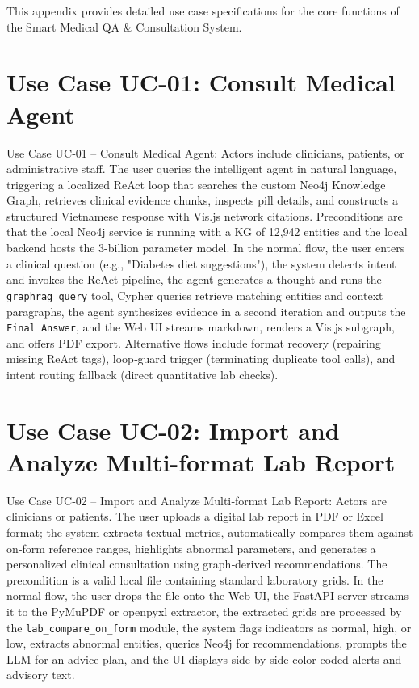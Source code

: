 \documentclass[../main.tex]{subfiles}
\begin{document}
This appendix provides detailed use case specifications for the core functions of the Smart Medical QA \& Consultation System.

\section{Use Case UC-01: Consult Medical Agent}
\label{section:uc-01}
Use Case UC‑01 – Consult Medical Agent: Actors include clinicians, patients, or administrative staff. The user queries the intelligent agent in natural language, triggering a localized ReAct loop that searches the custom Neo4j Knowledge Graph, retrieves clinical evidence chunks, inspects pill details, and constructs a structured Vietnamese response with Vis.js network citations. Preconditions are that the local Neo4j service is running with a KG of 12,942 entities and the local backend hosts the 3-billion parameter model. In the normal flow, the user enters a clinical question (e.g., "Diabetes diet suggestions"), the system detects intent and invokes the ReAct pipeline, the agent generates a thought and runs the \texttt{graphrag\_query} tool, Cypher queries retrieve matching entities and context paragraphs, the agent synthesizes evidence in a second iteration and outputs the \texttt{Final Answer}, and the Web UI streams markdown, renders a Vis.js subgraph, and offers PDF export. Alternative flows include format recovery (repairing missing ReAct tags), loop‑guard trigger (terminating duplicate tool calls), and intent routing fallback (direct quantitative lab checks).

\section{Use Case UC-02: Import and Analyze Multi-format Lab Report}
\label{section:uc-02}
Use Case UC‑02 – Import and Analyze Multi‑format Lab Report: Actors are clinicians or patients. The user uploads a digital lab report in PDF or Excel format; the system extracts textual metrics, automatically compares them against on‑form reference ranges, highlights abnormal parameters, and generates a personalized clinical consultation using graph‑derived recommendations. The precondition is a valid local file containing standard laboratory grids. In the normal flow, the user drops the file onto the Web UI, the FastAPI server streams it to the PyMuPDF or openpyxl extractor, the extracted grids are processed by the \texttt{lab\_compare\_on\_form} module, the system flags indicators as normal, high, or low, extracts abnormal entities, queries Neo4j for recommendations, prompts the LLM for an advice plan, and the UI displays side‑by‑side color‑coded alerts and advisory text.
\end{document}
